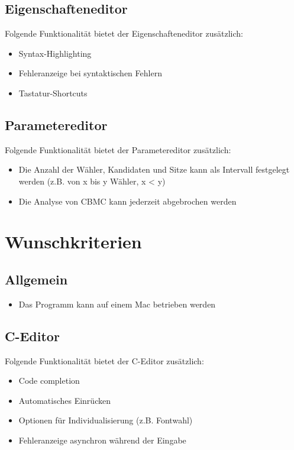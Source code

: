 \documentclass[a4paper]{scrreprt}
\begin{document}
\subsection{Eigenschafteneditor}
Folgende Funktionalität bietet der Eigenschafteneditor zusätzlich:
\begin{itemize}
	\item Syntax-Highlighting
	\item Fehleranzeige bei syntaktischen Fehlern
	\item Tastatur-Shortcuts
\end{itemize}

\subsection{Parametereditor}
Folgende Funktionalität bietet der Parametereditor zusätzlich:
\begin{itemize}
	\item Die Anzahl der Wähler, Kandidaten und Sitze kann als Intervall festgelegt werden (z.B. von x bis y Wähler, x < y)
	\item Die Analyse von \ac{CBMC} kann jederzeit abgebrochen werden
\end{itemize}



\section{Wunschkriterien}
\subsection{Allgemein}
\begin{itemize}
\item Das Programm kann auf einem Mac betrieben werden
\end{itemize}

\subsection{C-Editor}
Folgende Funktionalität bietet der C-Editor zusätzlich:
\begin{itemize}
	\item Code completion
	\item Automatisches Einrücken
	\item Optionen für Individualisierung (z.B. Fontwahl)
	\item Fehleranzeige asynchron während der Eingabe
\end{itemize}
\end{document}
